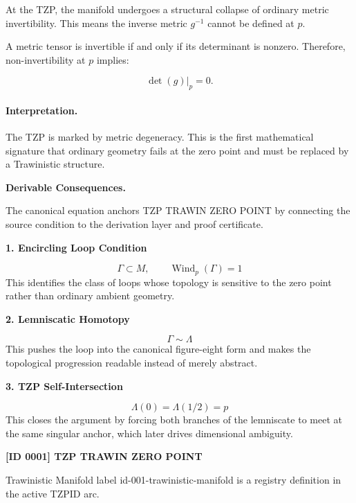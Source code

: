 At the TZP, the manifold undergoes a structural collapse of ordinary metric invertibility. This means the inverse metric $g^{-1}$ cannot be defined at $p$.

A metric tensor is invertible if and only if its determinant is nonzero. Therefore, non-invertibility at $p$ implies:

\begin{equation}
\det(g)\big|_{p}=0 .
\end{equation}

\paragraph{Interpretation.}
The TZP is marked by metric degeneracy. This is the first mathematical signature that ordinary geometry fails at the zero point and must be replaced by a Trawinistic structure.

\par\vspace{0.35em}
\noindent\textbf{Derivable Consequences.}\quad
\begingroup
\footnotesize
\raggedright
The canonical equation anchors TZP TRAWIN ZERO POINT by connecting the source condition to the derivation layer and proof certificate.
\par\endgroup

\noindent\textbf{1. Encircling Loop Condition}\par
\[
\Gamma \subset M,\qquad \operatorname{Wind}_{p}(\Gamma)=1
\]
\noindent This identifies the class of loops whose topology is sensitive to the zero point rather than ordinary ambient geometry.\par
\noindent\textbf{2. Lemniscatic Homotopy}\par
\[
\Gamma \sim \Lambda
\]
\noindent This pushes the loop into the canonical figure-eight form and makes the topological progression readable instead of merely abstract.\par
\noindent\textbf{3. TZP Self-Intersection}\par
\[
\Lambda(0)=\Lambda(1/2)=p
\]
\noindent This closes the argument by forcing both branches of the lemniscate to meet at the same singular anchor, which later drives dimensional ambiguity.\par

\clearpage
\noindent\textbf{[ID 0001] TZP TRAWIN ZERO POINT}\par
\vspace{0.35em}
\begingroup\small
{}
Trawinistic Manifold label id-001-trawinistic-manifold is a registry definition in the active TZPID arc.

